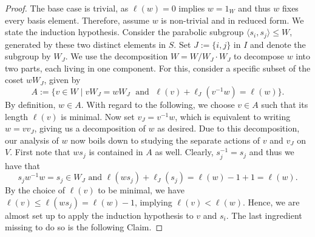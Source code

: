 \begin{proof}
    The base case is trivial, as \(\ell(w) = 0\) implies \(w = 1_W\) and thus \(w\) fixes every basis element.
    Therefore, assume \(w\) is non-trivial and in reduced form.
    We state the induction hypothesis.
    Consider the parabolic subgroup \(\langle s_i, s_j\rangle\leq W\), generated by these two distinct elements in \(S\).
    Set \(J := \{i, j\}\) in \(I\) and denote the subgroup by \(W_J\).
    We use the decomposition \(W = W/W_J \cdot W_J\) to decompose \(w\) into two parts, each living in one component.
    For this, consider a specific subset of the coset \(wW_J\), given by %
    \[A:=\{v\in W \;\vert\; vW_J = wW_J \;\text{ and }\; \ell(v) + \ell_J(v^{-1}w) = \ell(w)\}.\]
    By definition, \(w\in A\).
    With regard to the following, we choose \(v\in A\) such that its length \(\ell(v)\) is minimal.
    Now set \(v_J = v^{-1}w\), which is equivalent to writing \(w = vv_J\), giving us a decomposition of \(w\) as desired.
    Due to this decomposition, our analysis of \(w\) now boils down to studying the separate actions of \(v\) and \(v_J\) on \(V\).
    First note that \(ws_j\) is contained in \(A\) as well.
    Clearly, \(s_j^{-1} = s_j\) and thus we have that
    \[s_jw^{-1}w = s_j\in W_J \text{ and } \ell(ws_j) + \ell_J(s_j) = \ell(w) - 1 + 1 = \ell(w).\]
    By the choice of \(\ell(v)\) to be minimal, we have \(\ell(v)\leq \ell(ws_j) = \ell(w)-1\), implying \(\ell(v) < \ell(w)\).
    Hence, we are almost set up to apply the induction hypothesis to \(v\) and \(s_i\).
    The last ingredient missing to do so is the following Claim.

\end{proof}
